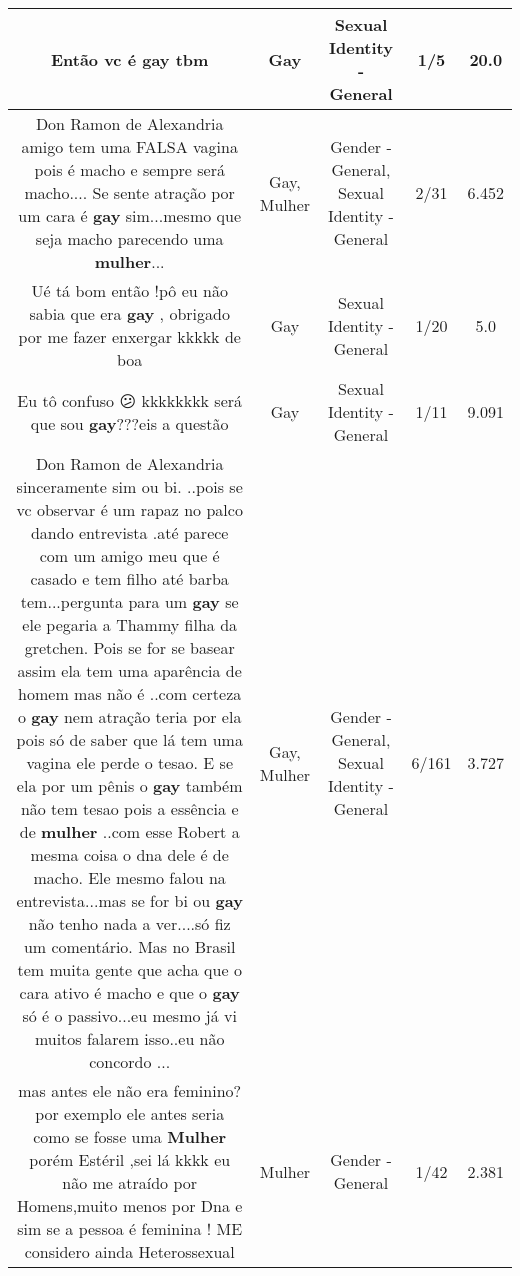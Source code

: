 \documentclass[11pt]{article}
\newlength\mylength
\begin{document}
\begin{center}
\begin{longtable}{|C{.65\mylength}|C{.30\mylength}|C{.12\mylength}|C{.12\mylength}|C{.12\mylength}|}
  \small Então vc é \textbf{gay} tbm\normalsize   & Gay & Sexual Identity - General & 1/5 & 20.0 \\  \hline
  \small Don Ramon de Alexandria  amigo tem uma FALSA vagina pois é macho e sempre será macho.... Se sente atração por um cara é \textbf{gay} sim...mesmo que seja macho parecendo uma \textbf{mulher}...\normalsize   & Gay, Mulher & Gender - General, Sexual Identity - General & 2/31 & 6.452 \\  \hline
  \small Ué tá bom então !pô eu não sabia que era \textbf{gay} , obrigado por me fazer enxergar kkkkk de boa\normalsize   & Gay & Sexual Identity - General & 1/20 & 5.0 \\  \hline
  \small Eu tô confuso 😕 kkkkkkkk será que sou \textbf{gay}???eis a questão\normalsize   & Gay & Sexual Identity - General & 1/11 & 9.091 \\  \hline
  \small Don Ramon de Alexandria  sinceramente sim ou bi. ..pois se vc observar é um rapaz no palco dando entrevista .até parece com um amigo meu que é casado e tem filho até barba tem...pergunta para um \textbf{gay} se ele pegaria a Thammy filha da gretchen. Pois se for se basear assim ela tem uma aparência de homem mas não é ..com certeza o \textbf{gay} nem atração teria por ela pois só de saber que lá tem uma vagina ele perde o tesao.  E se ela por um pênis o \textbf{gay} também não tem tesao pois a essência e de \textbf{mulher} ..com esse Robert a mesma coisa o dna dele é de macho. Ele mesmo falou na entrevista...mas se for bi ou \textbf{gay} não tenho nada a ver....só fiz um comentário.  Mas no Brasil tem muita gente que acha que o cara ativo é macho e que o \textbf{gay} só é o passivo...eu mesmo já vi muitos falarem isso..eu não concordo ...\normalsize   & Gay, Mulher & Gender - General, Sexual Identity - General & 6/161 & 3.727 \\  \hline
  \small mas antes ele não era feminino? por exemplo ele antes seria como se fosse uma \textbf{Mulher} porém Estéril ,sei lá kkkk eu não me atraído por Homens,muito menos por Dna e sim se a pessoa é feminina ! ME considero ainda Heterossexual\normalsize   & Mulher & Gender - General & 1/42 & 2.381 \\  \hline

\end{longtable}
\end{center}
\end{document}
